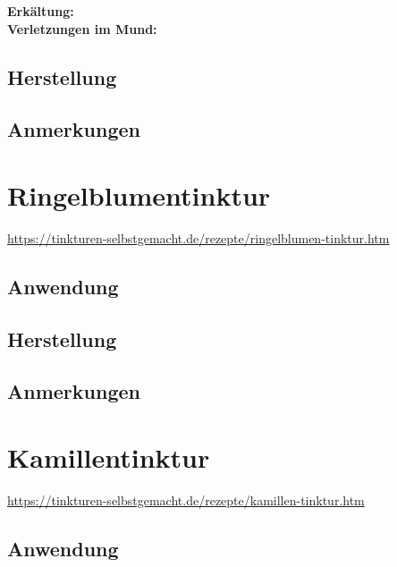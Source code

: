 \textbf{Erkältung:} \\ 

\textbf{Verletzungen im Mund:} \\

\subsection{Herstellung}
\subsection{Anmerkungen}



\newpage



\section{Ringelblumentinktur}


\cite{tinkturen}

\url{https://tinkturen-selbstgemacht.de/rezepte/ringelblumen-tinktur.htm}


\subsection{Anwendung} 
\subsection{Herstellung}
\subsection{Anmerkungen}



\newpage



\section{Kamillentinktur}


\cite{tinkturen}

\url{https://tinkturen-selbstgemacht.de/rezepte/kamillen-tinktur.htm}

\subsection{Anwendung}
